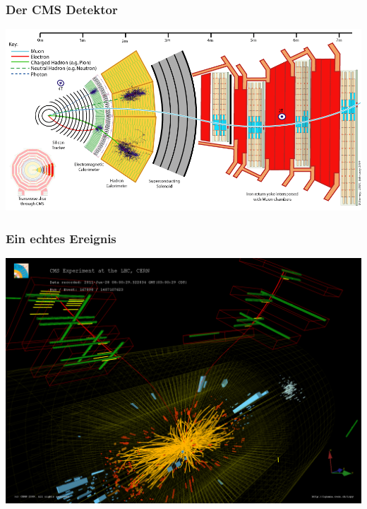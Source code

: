\documentclass[14pt]{beamer}
\begin{document}
\begin{frame}
	\frametitle{Der CMS Detektor}
	\begin{center}
		\includegraphics[width=\textwidth]{messprinzip.png}
	\end{center}
\end{frame}

\begin{frame}
	\frametitle{Ein echtes Ereignis}
	\begin{center}
		\includegraphics[width=\textwidth]{dimuon_event.png}
	\end{center}
\end{frame}
\end{document}
